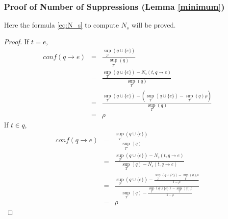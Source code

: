 \subsubsection{Proof of Number of Suppressions (Lemma \ref{minimum})}
\label{sec:proofN_s}
Here the formula \eqref{eq:N_s} to compute $N_s$ will be proved.
\begin{proof}
If $t = e$,
\begin{eqnarray*}
conf(q \to e)&=&\frac{{{{\sup }_{T'}}(q \cup \{ e\} )}}{{{{\sup }_{T'}}(q)}}\\
&=&\frac{{{{\sup }_T}(q \cup \{ e\} ) - {N_s}(t,q \to e)}}{{{{\sup }_T}(q)}}\\
&=&\frac{{{{\sup }_T}(q \cup \{ e\} ) - ({{\sup }_T}(q \cup \{ e\} ) - {{\sup }_T}(q)\rho )}}{{{{\sup }_T}(q)}}\\
&=&\rho
\end{eqnarray*}
If $t\in q$,
\begin{eqnarray*}
conf(q \to e)&=&\frac{{{{\sup }_{T'}}(q \cup \{ e\} )}}{{{{\sup }_{T'}}(q)}}\\
&=&\frac{{{{\sup }_T}(q \cup \{ e\} ) - {N_s}(t,q \to e)}}{{{{\sup }_T}(q) - {N_s}(t,q \to e)}}\\
&=&\frac{{{{\sup }_T}(q \cup \{ e\} ) - \frac{{{{\sup }_T}(q \cup \{ e\} ) - {{\sup }_T}(q)\rho }}{{1 - \rho }}}}{{{{\sup }_T}(q) - \frac{{{{\sup }_T}(q \cup \{ e\} ) - {{\sup }_T}(q)\rho }}{{1 - \rho }}}}\\
&=& \rho
\end{eqnarray*}
\end{proof}

